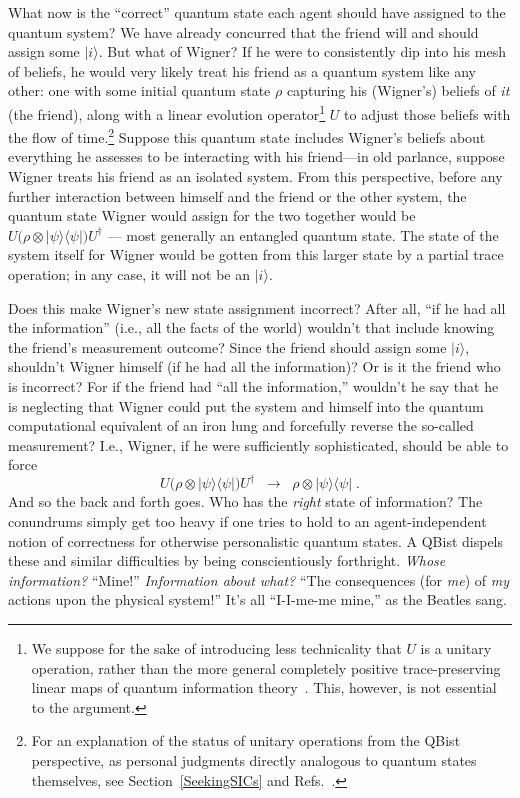 \documentclass[aps,pra,superscriptaddress,12pt,tightenlines,nofootinbib]{revtex4-2}
\begin{document}
What now is the ``correct'' quantum state each agent should have assigned to the quantum system?  We have already concurred that the friend will and
should assign some $|i\rangle$.  But what of Wigner?  If he were to
consistently dip into his mesh of beliefs, he would very likely treat
his friend as a quantum system like any other:  one with some initial
quantum state $\rho$ capturing his (Wigner's) beliefs of {\it it\/}
(the friend), along with a linear evolution operator\footnote{We
  suppose for the sake of introducing less technicality that $U$ is a
  unitary operation, rather than the more general completely positive
  trace-preserving linear maps of quantum information
  theory~\cite{Nielsen00}.  This, however, is not essential to the
  argument.} $U$ to adjust those beliefs with the flow of
time.\footnote{For an explanation of the status of unitary operations
  from the QBist perspective, as personal judgments directly analogous
  to quantum states themselves, see Section~\ref{SeekingSICs} and
  Refs.~\cite{Fuchs02,RMP,Leifer06}.}  Suppose this quantum state
includes Wigner's beliefs about everything he assesses to be
interacting with his friend---in old parlance, suppose Wigner treats
his friend as an isolated system. From this perspective, before any further interaction between himself and the friend or the other system, the quantum state Wigner would assign for the two together would be $U\big(\rho\otimes|\psi\rangle\langle\psi|\big)U^\dagger$ --- most generally an entangled quantum state.  The state of the system itself for Wigner would be gotten from this larger state by a partial trace operation; in any case, it will not be an $|i\rangle$.

Does this make Wigner's new state assignment incorrect?  After all, ``if he had all the information'' (i.e., all the facts of the world) wouldn't that include knowing the friend's measurement outcome? Since the friend should assign some $|i\rangle$, shouldn't Wigner himself (if he had all the information)?  Or is it the friend who is incorrect?  For if the friend had ``all the information,'' wouldn't he say that he is neglecting that Wigner could put the system and himself into the quantum computational equivalent of an iron lung and forcefully reverse the so-called measurement?  I.e., Wigner, if he were sufficiently sophisticated, should be able to force
\begin{equation}
U\big(\rho\otimes|\psi\rangle\langle\psi|\big)U^\dagger\;\;\longrightarrow\;\;\rho\otimes|\psi\rangle\langle\psi|\;.
\label{RatifiedLatified}
\end{equation}
And so the back and forth goes.  Who has the {\it right\/} state of information?  The conundrums simply get too heavy if one tries to hold to an agent-independent notion of correctness for otherwise personalistic quantum states.  A QBist dispels these and similar difficulties by being conscientiously forthright.  {\it Whose information?\/}  ``Mine!''  {\it Information about what?\/}  ``The consequences (for {\it me\/}) of {\it my\/} actions upon the physical system!''  It's all ``I-I-me-me mine,'' as the Beatles sang.
\end{document}
